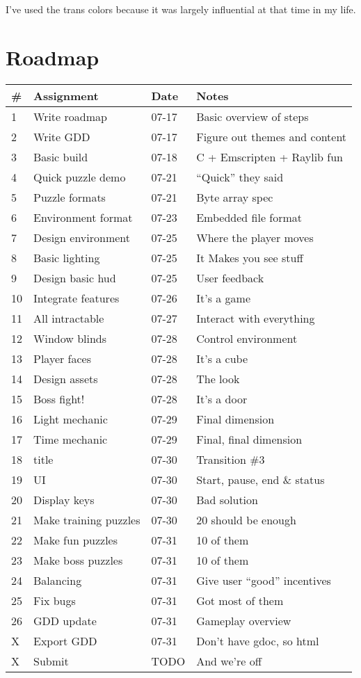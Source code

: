 \documentclass[12pt, letterpaper]{article}
\begin{document}
I've used the trans colors because it was largely influential at that time in
my life.

\section{Roadmap}

\bgroup
\def\arraystretch{1.5}
\begin{tabular}{ R{0.4cm} p{4cm} p{1.5cm} p{5.5cm} }
\toprule
{} & \textbf{Assignment} & \textbf{Date} & \textbf{Notes} \\ 
 & Write roadmap & 07-17 & Basic overview of steps \\
2 & Write GDD & 07-17 & Figure out themes and content \\
3 & Basic build & 07-18 & C + Emscripten + Raylib fun \\
4 & Quick puzzle demo & 07-21 & ``Quick'' they said \\
5 & Puzzle formats & 07-21 & Byte array spec \\
6 & Environment format & 07-23 & Embedded file format \\
7 & Design environment & 07-25 & Where the player moves \\
8 & Basic lighting & 07-25 & It Makes you see stuff \\
9 & Design basic hud & 07-25 & User feedback \\
10 & Integrate features & 07-26 & It's a game \\
11 & All intractable & 07-27 & Interact with everything \\
12 & Window blinds & 07-28 & Control environment \\
13 & Player faces & 07-28 & It's a cube \\
14 & Design assets & 07-28 & The look \\
15 & Boss fight! & 07-28 & It's a door \\
16 & Light mechanic & 07-29 & Final dimension \\
17 & Time mechanic & 07-29 & Final, final dimension \\
18 & title & 07-30 & Transition \#3 \\
19 & UI & 07-30 & Start, pause, end \& status \\
20 & Display keys & 07-30 & Bad solution \\
21 & Make training puzzles & 07-30 & 20 should be enough \\
22 & Make fun puzzles & 07-31 & 10 of them \\
23 & Make boss puzzles & 07-31 & 10 of them \\
24 & Balancing & 07-31 & Give user ``good'' incentives \\
25 & Fix bugs & 07-31 & Got most of them \\
26 & GDD update & 07-31 & Gameplay overview \\

X & Export GDD & 07-31 & Don't have gdoc, so html \\
X & Submit & TODO & And we're off \\

\bottomrule
\end{tabular}
\egroup
\end{document}

